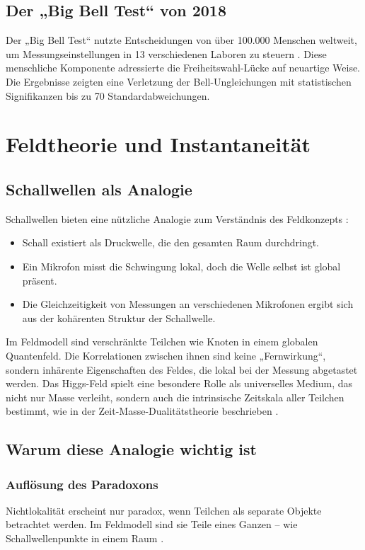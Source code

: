 \documentclass[a4paper,12pt]{article}
\begin{document}
	\subsection{Der „Big Bell Test“ von 2018}
	Der „Big Bell Test“ nutzte Entscheidungen von über 100.000 Menschen weltweit, um Messungseinstellungen in 13 verschiedenen Laboren zu steuern \cite{BigBellTest2018}. Diese menschliche Komponente adressierte die Freiheitswahl-Lücke auf neuartige Weise. Die Ergebnisse zeigten eine Verletzung der Bell-Ungleichungen mit statistischen Signifikanzen bis zu 70 Standardabweichungen.
	
	\section{Feldtheorie und Instantaneität}
	\subsection{Schallwellen als Analogie}
	Schallwellen bieten eine nützliche Analogie zum Verständnis des Feldkonzepts \cite{Bohm1980}:
	\begin{itemize}
		\item Schall existiert als Druckwelle, die den gesamten Raum durchdringt.
		\item Ein Mikrofon misst die Schwingung lokal, doch die Welle selbst ist global präsent.
		\item Die Gleichzeitigkeit von Messungen an verschiedenen Mikrofonen ergibt sich aus der kohärenten Struktur der Schallwelle.
	\end{itemize}
	Im Feldmodell sind verschränkte Teilchen wie Knoten in einem globalen Quantenfeld. Die Korrelationen zwischen ihnen sind keine „Fernwirkung“, sondern inhärente Eigenschaften des Feldes, die lokal bei der Messung abgetastet werden. Das Higgs-Feld spielt eine besondere Rolle als universelles Medium, das nicht nur Masse verleiht, sondern auch die intrinsische Zeitskala aller Teilchen bestimmt, wie in der Zeit-Masse-Dualitätstheorie beschrieben \cite{Pascher2024}.
	
	\subsection{Warum diese Analogie wichtig ist}
	\subsubsection{Auflösung des Paradoxons}
	Nichtlokalität erscheint nur paradox, wenn Teilchen als separate Objekte betrachtet werden. Im Feldmodell sind sie Teile eines Ganzen – wie Schallwellenpunkte in einem Raum \cite{Bohm1980}.
\end{document}
